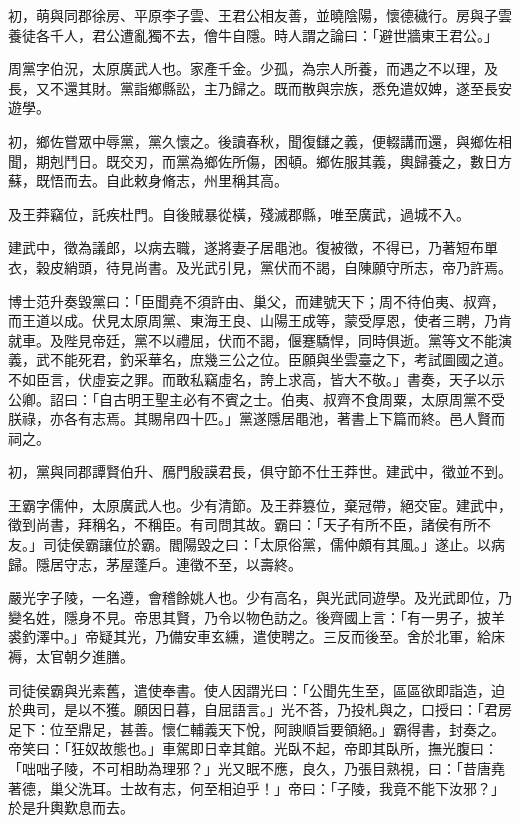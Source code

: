 \begin{pinyinscope}
初，萌與同郡徐房、平原李子雲、王君公相友善，並曉陰陽，懷德穢行。房與子雲養徒各千人，君公遭亂獨不去，儈牛自隱。時人謂之論曰：「避世牆東王君公。」

周黨字伯況，太原廣武人也。家產千金。少孤，為宗人所養，而遇之不以理，及長，又不還其財。黨詣鄉縣訟，主乃歸之。既而散與宗族，悉免遣奴婢，遂至長安遊學。

初，鄉佐嘗眾中辱黨，黨久懷之。後讀春秋，聞復讎之義，便輟講而還，與鄉佐相聞，期剋鬥日。既交刃，而黨為鄉佐所傷，困頓。鄉佐服其義，輿歸養之，數日方蘇，既悟而去。自此敕身脩志，州里稱其高。

及王莽竊位，託疾杜門。自後賊暴從橫，殘滅郡縣，唯至廣武，過城不入。

建武中，徵為議郎，以病去職，遂將妻子居黽池。復被徵，不得已，乃著短布單衣，榖皮綃頭，待見尚書。及光武引見，黨伏而不謁，自陳願守所志，帝乃許焉。

博士范升奏毀黨曰：「臣聞堯不須許由、巢父，而建號天下；周不待伯夷、叔齊，而王道以成。伏見太原周黨、東海王良、山陽王成等，蒙受厚恩，使者三聘，乃肯就車。及陛見帝廷，黨不以禮屈，伏而不謁，偃蹇驕悍，同時俱逝。黨等文不能演義，武不能死君，釣采華名，庶幾三公之位。臣願與坐雲臺之下，考試圖國之道。不如臣言，伏虛妄之罪。而敢私竊虛名，誇上求高，皆大不敬。」書奏，天子以示公卿。詔曰：「自古明王聖主必有不賓之士。伯夷、叔齊不食周粟，太原周黨不受朕祿，亦各有志焉。其賜帛四十匹。」黨遂隱居黽池，著書上下篇而終。邑人賢而祠之。

初，黨與同郡譚賢伯升、鴈門殷謨君長，俱守節不仕王莽世。建武中，徵並不到。

王霸字儒仲，太原廣武人也。少有清節。及王莽篡位，棄冠帶，絕交宦。建武中，徵到尚書，拜稱名，不稱臣。有司問其故。霸曰：「天子有所不臣，諸侯有所不友。」司徒侯霸讓位於霸。閻陽毀之曰：「太原俗黨，儒仲頗有其風。」遂止。以病歸。隱居守志，茅屋蓬戶。連徵不至，以壽終。

嚴光字子陵，一名遵，會稽餘姚人也。少有高名，與光武同遊學。及光武即位，乃變名姓，隱身不見。帝思其賢，乃令以物色訪之。後齊國上言：「有一男子，披羊裘釣澤中。」帝疑其光，乃備安車玄纁，遣使聘之。三反而後至。舍於北軍，給床褥，太官朝夕進膳。

司徒侯霸與光素舊，遣使奉書。使人因謂光曰：「公聞先生至，區區欲即詣造，迫於典司，是以不獲。願因日暮，自屈語言。」光不荅，乃投札與之，口授曰：「君房足下：位至鼎足，甚善。懷仁輔義天下悅，阿諛順旨要領絕。」霸得書，封奏之。帝笑曰：「狂奴故態也。」車駕即日幸其館。光臥不起，帝即其臥所，撫光腹曰：「咄咄子陵，不可相助為理邪？」光又眠不應，良久，乃張目熟視，曰：「昔唐堯著德，巢父洗耳。士故有志，何至相迫乎！」帝曰：「子陵，我竟不能下汝邪？」於是升輿歎息而去。


\end{pinyinscope}
